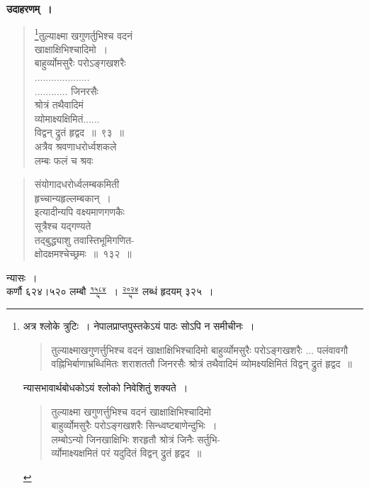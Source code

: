 \documentclass[11pt, openany]{book}
\begin{document}
\textbf{उदाहरणम्~।} 
\begin{quote}
    \bqt 
    \footnote{अत्र श्लोके त्रुटिः~। नेपालप्राप्तपुस्तकेऽयं पाठः सोऽपि न
समीचीनः~। 
\begin{quote}
तुल्याक्ष्माखगुणर्त्तुभिश्च वदनं खाक्षाक्षिभिश्चादिमो
बाहुर्व्योमसुरैः परोऽङ्गखशरैः ... पलंवावगौ वह्निभिर्बाणाभ्रब्धिमितः
शराशततौ जिनरसैः श्रोत्रं तथैवादिमं व्योमक्ष्यक्षिमितं विद्वन् द्रुतं हृद्वद~॥
\end{quote}

\hspace{2mm} न्यासभावार्थबोधकोऽयं श्लोको निवेशितुं शक्यते~।

\begin{quote}
तुल्याक्ष्मा खगुणर्त्तुभिश्च वदनं खाक्षाक्षिभिश्चादिमो\\
बाहुर्व्योमसुरैः परोऽङ्गखशरैः सिन्ध्वष्टबाणेन्दुभिः~। \\
लम्बोऽन्यो जिनखाक्षिभिः शरहृतौ श्रोत्रं जिनैः सर्तुभि-\\
र्व्योमाक्ष्यक्षमितं परं यदुदितं विद्वन् द्रुतं हृद्वद~॥
\end{quote}}तुल्याक्ष्मा खगुणर्तुभिश्च वदनं\\
खाक्षाक्षिभिश्चादिमो~। \\
बाहुर्व्योमसुरैः परोऽङ्गखशरैः\\
....................\\
............ जिनरसैः\\
श्रोत्रं तथैवादिमं\\
व्योमाक्ष्यक्षिमितं......\\
विद्वन् द्रुतं हृद्वद~॥~९३~॥~\\
अत्रैव श्रवणाधरोर्ध्वशकले\\
लम्बः फलं च श्रवः
\end{quote}

\newpage%

\begin{quote}
    \bqt 
संयोगादधरोर्ध्वलम्बकमिती\\
हृच्चान्यहृल्लम्बकान्~। \\
इत्यादीन्यपि वक्ष्यमाणगणकैः\\
सूत्रैश्च यद्गण्यते\\
तद्बुद्ध्याशु तवास्तिभूमिगणित-\\
क्षोदक्षमश्चेच्छ्रमः~॥~१३२~॥~
\end{quote}

न्यासः~। \\

\vspace{-3mm}
कर्णौ ६२४।५२० लम्बौ $\frac{\mbox{१५८४}}{\mbox{५}}$~। $\frac{\mbox{२०२४}}{\mbox{५}}$ लब्धं हृदयम् ३२५~।
\vspace{-2mm}
\end{document}
